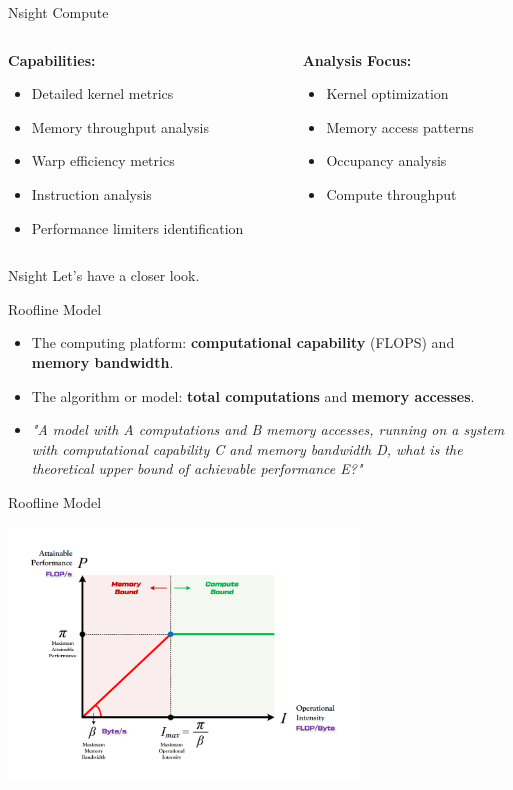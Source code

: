 \begin{frame}{Nsight Compute}
    \begin{columns}
        \begin{column}{0.6\textwidth}
            \textbf{Capabilities:}
            \begin{itemize}
                \item Detailed kernel metrics
                \item Memory throughput analysis
                \item Warp efficiency metrics
                \item Instruction analysis
                \item Performance limiters identification
            \end{itemize}
        \end{column}
        \begin{column}{0.4\textwidth}
            \textbf{Analysis Focus:}
            \begin{itemize}
                \item Kernel optimization
                \item Memory access patterns
                \item Occupancy analysis
                \item Compute throughput
            \end{itemize}
        \end{column}
    \end{columns}
\end{frame}

\begin{frame}{Nsight}
    Let's have a closer look.
\end{frame}

\begin{frame}{Roofline Model}
    \begin{itemize}
        \item The computing platform: \textbf{computational capability} (FLOPS) and \textbf{memory bandwidth}.
        \item The algorithm or model: \textbf{total computations} and \textbf{memory accesses}.
        \item \textit{"A model with A computations and B memory accesses, running on a system with computational capability C and memory bandwidth D, what is the theoretical upper bound of achievable performance E?"}
    \end{itemize}
\end{frame}

\begin{frame}{Roofline Model}
    \begin{center}
        \includegraphics[width=0.7\textwidth]{img/roofline.jpg}
    \end{center}
\end{frame}